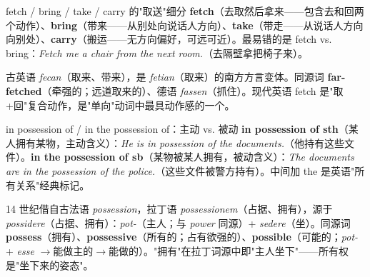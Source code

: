 \documentclass[../main.tex]{subfiles}
\begin{document}
\begin{gram}{fetch / bring / take / carry 的"取送"细分}
\textbf{fetch}（去取然后拿来——包含去和回两个动作）、\textbf{bring}（带来——从别处向说话人方向）、\textbf{take}（带走——从说话人方向向别处）、\textbf{carry}（搬运——无方向偏好，可远可近）。最易错的是 fetch vs. bring：\textit{Fetch me a chair from the next room.}（去隔壁拿把椅子来）。
\end{gram}

\begin{origin}
古英语 \textit{fecan}（取来、带来），是 \textit{fetian}（取来）的南方方言变体。同源词 \textbf{far-fetched}（牵强的；远道取来的）、德语 \textit{fassen}（抓住）。现代英语 fetch 是"取+回"复合动作，是"单向"动词中最具动作感的一个。
\end{origin}




\begin{gram}{in possession of / in the possession of：主动 vs. 被动}
\textbf{in possession of sth}（某人拥有某物，主动含义）：\textit{He is in possession of the documents.}（他持有这些文件）。\textbf{in the possession of sb}（某物被某人拥有，被动含义）：\textit{The documents are in the possession of the police.}（这些文件被警方持有）。中间加 the 是英语"所有关系"经典标记。
\end{gram}

\begin{origin}
14 世纪借自古法语 \textit{possession}，拉丁语 \textit{possessionem}（占据、拥有），源于 \textit{possidere}（占据、拥有）：\textit{pot-}（主人；与 \textit{power} 同源）+ \textit{sedere}（坐）。同源词 \textbf{possess}（拥有）、\textbf{possessive}（所有的；占有欲强的）、\textbf{possible}（可能的；\textit{pot-} + \textit{esse} $\to$能做主的$\to$能做的）。"拥有"在拉丁词源中即"主人坐下"——所有权是"坐下来的姿态"。
\end{origin}
\end{document}
